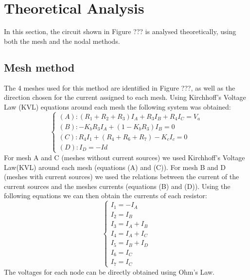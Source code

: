 \section{Theoretical Analysis}
\label{sec:analysis}

In this section, the circuit shown in Figure ??? is analysed
theoretically, using both the mesh and the nodal methods.


\newpage
\subsection{Mesh method}

The 4 meshes used for this method are identified in Figure ???, as well as the direction chosen for the current assigned to each mesh.
Using Kirchhoff's Voltage Law (KVL) equations around each mesh the following system was obtained:
\begin{equation}
  \begin{cases}
    \left(A\right): \left(R_{1}+R_{2}+R_{3}\right)I_{A}+R_{3}I_{B}+R_{4}I_{C}=V_{a} \\
    \left(B\right): -K_{b}R_{3}I_{A}+\left(1-K_{b}R_{3}\right)I_{B}=0               \\
    \left(C\right): R_{4}I_{1}+\left(R_{4}+R_{6}+R_{7} \right) -K_{c}I_{c}=0        \\
    \left(D\right): I_{D}=-Id
  \end{cases}
\end{equation}
For mesh A and C (meshes without current sources) we used Kirchhoff's Voltage Law(KVL) around each mesh (equations (A) and (C)).
For mesh B and D (meshes with current sources) we used the relations between the current of the current sources and the meshes currents (equations (B) and (D)).
Using the following equations we can then obtain the currents of each resistor:
\begin{equation}
  \begin{cases}
    I_{1}=-I_{A}      \\
    I_{2}=I_{B}       \\
    I_{3}=I_{A}+I_{B} \\
    I_{4}=I_{A}+I_{C} \\
    I_{5}=I_{B}+I_{D} \\
    I_{6}=I_{C}       \\
    I_{7}=I_{C}
  \end{cases}
\end{equation}
The voltages for each node can be directly obtained using Ohm's Law.

